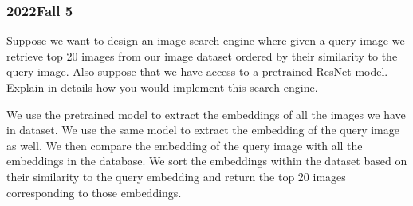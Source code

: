 \documentclass[11pt, english]{article}
\begin{document}
\subsubsection{2022Fall 5}
Suppose we want to design an image search engine where given a query image we retrieve top 20 images from our image dataset ordered by their similarity to the query image. Also suppose that we have access to a pretrained ResNet model. Explain in details how you would implement this search engine. 

We use the pretrained model to extract the embeddings of all the images we have in dataset.
We use the same model to extract the embedding of the query image as well.
We then compare the embedding of the query image with all the embeddings in the database.
We sort the embeddings within the dataset based on their similarity to the query embedding and return the top 20 images corresponding to those embeddings.
\end{document}
